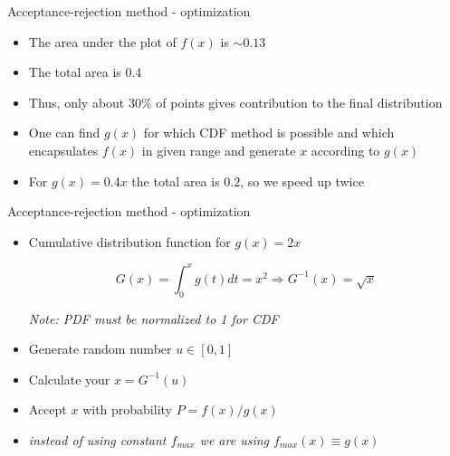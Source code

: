 \begin{slide}[toc=]{Acceptance-rejection method - optimization}
\null\vfill

  \twocolumn
  {
    \begin{itemize}
      \item The area under the plot of $f(x)$ is $\sim 0.13$
      \item The total area is $0.4$
      \item Thus, only about $30\%$ of points gives contribution to the final distribution
      \item One can find $g(x)$ for which CDF method is possible and which encapsulates $f(x)$ in given range and generate $x$ according to $g(x)$
      \item For $g(x) = 0.4 x$ the total area is $0.2$, so we speed up twice
    \end{itemize}
  }
  {
    
    
  }

\vfill\null
\end{slide}


\begin{slide}[toc=]{Acceptance-rejection method - optimization}
\null\vfill

  \begin{itemize}
    \item Cumulative distribution function for $g(x) = 2x$
    
    $$G(x) = \int_0^x g(t)dt = x^2 \Rightarrow G^{-1}(x) = \sqrt{x}$$
    
    {\it\color{pdcolor3}Note: PDF must be normalized to 1 for CDF}
    
    \item Generate random number $u \in [0, 1]$
    \item Calculate your $x = G^{-1}(u)$
    \item Accept $x$ with probability $P = f(x) / g(x)$
    \item[] {\it\color{pdcolor3}instead of using constant $f_{max}$ we are using $f_{max}(x) \equiv g(x)$}
    
  \end{itemize}

\vfill\null
\end{slide}